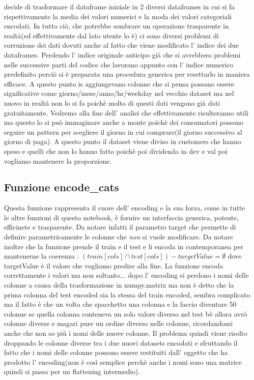 \documentclass[11pt]{article}
\begin{document}
decide di trasformare il dataframe iniziale in 2 diversi dataframes in
cui si fa rispettivamente la media dei valori numerici e la moda dei
valori categoriali encodati. In tutto ciò, che potrebbe sembrare un
operazione trasparente in realtà(ed effettivamente dal lato utente lo è)
ci sono diversi problemi di corruzione dei dati dovuti anche al fatto
che viene modificato l' indice dei due dataframes. Perdendo l' indice
originale anticipo già che si avrebbero problemi nelle successive parti
del codice che lavorano appunto con l' indice numerico predefinito
perciò si è preparata una procedura generica per resettarlo in maniera
efficace. A questo punto is aggiungevano colonne che si pensa possano
essere significative come giorno/mese/anno/hr/weekday nel vecchio
dataset ma nel nuovo in realtà non lo si fa poichè molto di questi dati
vengono già dati gratuitamente. Vedremo alla fine dell' analisi che
effettivamente risulteranno utili ma questo lo si può immaginare anche a
monte poichè dei consumatori possono seguire un pattern per scegliere il
giorno in cui comprare(il giorno successivo al giorno di paga). A questo
punto il dataset viene diviso in customers che hanno speso e quelli che
non lo hanno fatto poichè poi dividendo in dev e val poi vogliamo
mantenere la proporzione.

\subsection{Funzione encode\_cats}\label{funzione-encode_cats}

Questa funzione rappresenta il cuore dell' encoding e la sua forza, come
in tutte le altre funzioni di questo notebook, è fornire un interfaccia
generica, potente, efficinete e trasparente. Da notare infatti il
parametro target che permette di definire parametricamente le colonne
che \emph{non} si vuole modificare. Da notare inoltre che la funzione
prende il train e il test e li encoda in contemporanea per mantenerne la
coerenza : \((train[cols] \cap test[cols]) - targetValue = \emptyset\)
dove targetValue è il valore che vogliamo predire alla fine. La funzione
encoda correttamente i valori ma non soltanto... dopo l' encoding si
perdono i nomi delle colonne a causa della trasformazione in
numpy.matrix ma non è detto che la prima colonna del test encoded sia la
stessa del train encoded, sembra complicato ma il fatto è che un volta
che spacchetto una colonna e la faccio diventare 50 colonne se quella
colonna conteneva un solo valore diverso nel test bè allora avrò colonne
diverse e magari pure un ordine diverso nelle colonne, ricordandomi
anche che non so più i nomi delle nuove colonne. Il problema quindi
viene risolto droppando le colonne diverse tra i due nuovi datasets
encodati e sfruttando il fatto che i nomi delle colonne possono essere
restituiti dall' oggetto che ha prodotto l' encoding(non è così semplice
perchè anche i nomi sono una matrice quindi si passa per un flattening
intermedio).
\end{document}
